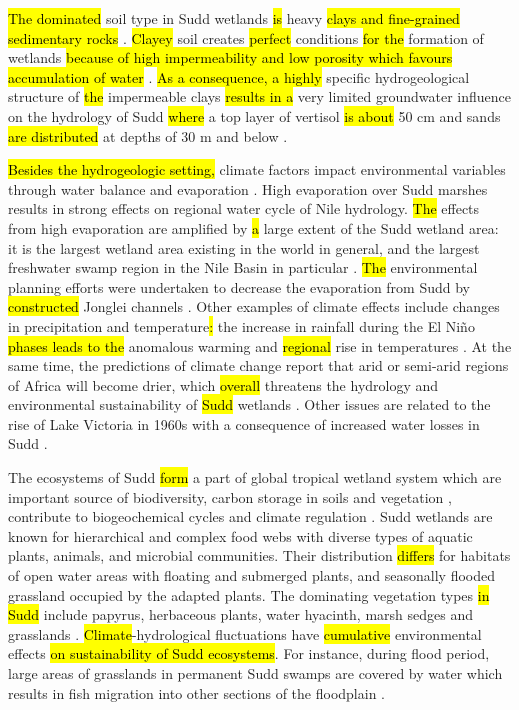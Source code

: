 \documentclass[sustainability,article,submit,pdftex,moreauthors]{Definitions/mdpi}
\begin{document}
\hl{The dominated} soil type\hl{ }in Sudd wetlands \hl{is} heavy \hl{clays and fine-grained sedimentary rocks} \cite{Wolman}. \hl{Clayey} soil creates \hl{perfect} conditions \hl{for the }formation of wetlands \hl{because of high impermeability and low porosity which favours accumulation of water} \cite{Lindh202222}. \hl{As a consequence, a highly} specific hydrogeological structure of \hl{the} impermeable clays \hl{results in a }very limited groundwater influence on the hydrology of Sudd\hl{ where }a top layer of vertisol \hl{is about } 50 cm and sands \hl{are distributed }at depths of\hl{ }30 m and below \cite{whiteman1971geology}. 

\hl{Besides the hydrogeologic setting, }climate factors impact environmental variables through water balance \cite{SutcliffeParks} and evaporation \cite{DIVITTORIO2021100922}. High evaporation over Sudd marshes results in strong effects on regional water cycle of Nile hydrology. \hl{The} effects from high evaporation are amplified by \hl{a} large extent of the Sudd wetland area: it is the largest wetland area existing in the world in general, and the largest freshwater swamp region in the Nile Basin in particular \cite{Woodward}. \hl{The }environmental planning efforts were undertaken to decrease the evaporation from Sudd by \hl{constructed }Jonglei channels \cite{SutcliffeParks1987}. Other examples of climate effects include changes in precipitation and temperature\hl{: }the increase in rainfall\hl{ }during the El Niño \hl{phases leads to the }anomalous warming and \hl{regional }rise in temperatures\hl{ }\cite{Birkettetal1999}. At the same time, the predictions of climate change report that\hl{ }arid or semi-arid regions of Africa will become drier, which \hl{overall }threatens the hydrology and environmental sustainability of \hl{Sudd }wetlands \cite{Mitchell}. Other issues are related to the rise of Lake Victoria in 1960s with a consequence of increased water losses in Sudd \cite{Sutcliffe2018}.

The ecosystems of Sudd\hl{ form} a part of global tropical wetland system which are important source of biodiversity, carbon storage in soils and vegetation \cite{Thompson}, contribute to biogeochemical cycles and climate regulation \cite{Fynn}. Sudd wetlands are known for\hl{ }hierarchical and complex food webs with diverse types of aquatic plants, animals, and microbial communities. Their distribution \hl{differs} for habitats of open water areas with floating and submerged plants, and seasonally flooded grassland occupied by the adapted plants. The dominating vegetation types \hl{in Sudd }include papyrus, herbaceous plants, water hyacinth, marsh sedges and grasslands \cite{PACINI2018142}. \hl{Climate}-hydrological fluctuations have \hl{cumulative }environmental effects \hl{on sustainability of Sudd ecosystems}. For instance, during flood period, large areas of grasslands in permanent Sudd swamps are covered by water which results in fish migration into other sections of the floodplain \cite{Hickley}.
\end{document}
